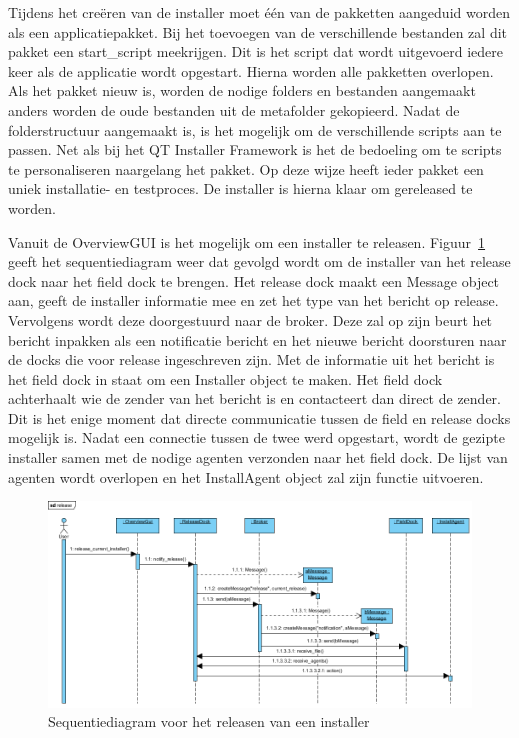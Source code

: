 Tijdens het creëren van de installer moet één van de pakketten aangeduid worden als een applicatiepakket.
Bij het toevoegen van de verschillende bestanden zal dit pakket een start\_script meekrijgen.
Dit is het script dat wordt uitgevoerd iedere keer als de applicatie wordt opgestart.
Hierna worden alle pakketten overlopen.
Als het pakket nieuw is, worden de nodige folders en bestanden aangemaakt anders worden de oude bestanden uit de metafolder gekopieerd.
Nadat de folderstructuur aangemaakt is, is het mogelijk om de verschillende scripts aan te passen.
Net als bij het QT Installer Framework is het de bedoeling om te scripts te personaliseren naargelang het pakket.
Op deze wijze heeft ieder pakket een uniek installatie- en testproces.
De installer is hierna klaar om gereleased te worden.

Vanuit de OverviewGUI is het mogelijk om een installer te releasen.
Figuur~\ref{fig:releaseSeq} geeft het sequentiediagram weer dat gevolgd wordt om de installer van het release dock naar het field dock te brengen.
Het release dock maakt een Message object aan, geeft de installer informatie mee en zet het type van het bericht op release.
Vervolgens wordt deze doorgestuurd naar de broker.
Deze zal op zijn beurt het bericht inpakken als een notificatie bericht en het nieuwe bericht doorsturen naar de docks die voor release ingeschreven zijn.
Met de informatie uit het bericht is het field dock in staat om een Installer object te maken.
Het field dock achterhaalt wie de zender van het bericht is en contacteert dan direct de zender. Dit is het enige moment dat directe communicatie tussen de field en release docks mogelijk is.
Nadat een connectie tussen de twee werd opgestart, wordt de gezipte installer samen met de nodige agenten verzonden naar het field dock.
De lijst van agenten wordt overlopen en het InstallAgent object zal zijn functie uitvoeren.

\begin{figure}
\includegraphics[width=\textwidth,height=\textheight,keepaspectratio]{afbeelding/seqRelease.png}
\centering
\caption{Sequentiediagram voor het releasen van een installer}
\label{fig:releaseSeq}
\end{figure}

